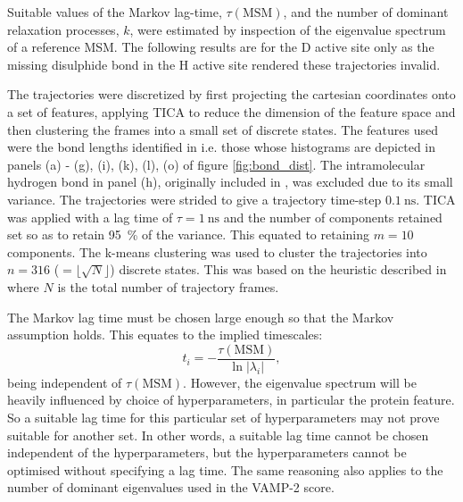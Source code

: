 
Suitable values of the Markov lag-time, $\tau(\mathrm{MSM})$, and  the number of dominant relaxation processes, $k$, were estimated by inspection of the eigenvalue spectrum of a reference MSM. The following results are for the D active site only as the missing disulphide bond in the H active site rendered these trajectories invalid.

The trajectories were discretized by first projecting the cartesian coordinates onto a set of features, applying TICA to reduce the dimension of the feature space and then clustering the frames into a small set of discrete states.  The features used were the bond lengths identified in \cite{ranaghanInitioQMMM2017} i.e. those whose histograms are depicted in panels (a) - (g), (i), (k), (l), (o) of figure \ref{fig:bond_dist}. The intramolecular hydrogen bond in panel (h), originally included in \cite{ranaghanInitioQMMM2017}, was excluded due to its small variance. The trajectories were strided to give a trajectory time-step $\SI{0.1}{\nano\second}$. TICA was applied with a lag time of $\tau=\SI{1}{\nano\second}$ and the number of components retained set so as to retain \SI{95}{\percent} of the variance. This equated to retaining $m=10$ components. The k-means clustering was used to cluster the trajectories into $n = 316$ ($=\lfloor\sqrt{N}\rfloor$) discrete states. This was based on the heuristic described in \cite{husicWardClusteringImproves2017a} where $N$ is the total number of trajectory frames.  

The Markov lag time must be chosen large enough so that the Markov assumption holds. This equates to the implied timescales:
\begin{equation*}
    t_{i}=-\frac{\tau(\mathrm{MSM})}{\ln{|\lambda_{i}|}}, 
\end{equation*} 
being independent of $\tau(\mathrm{MSM})$. However, the eigenvalue spectrum will be heavily influenced by choice of hyperparameters, in particular the protein feature. So a suitable lag time for this particular set of hyperparameters may not prove suitable for another set. In other words, a suitable lag time cannot be chosen independent of the hyperparameters, but the hyperparameters cannot be optimised without specifying a lag time. The same reasoning also applies to the number of dominant eigenvalues used in the VAMP-2 score. 


